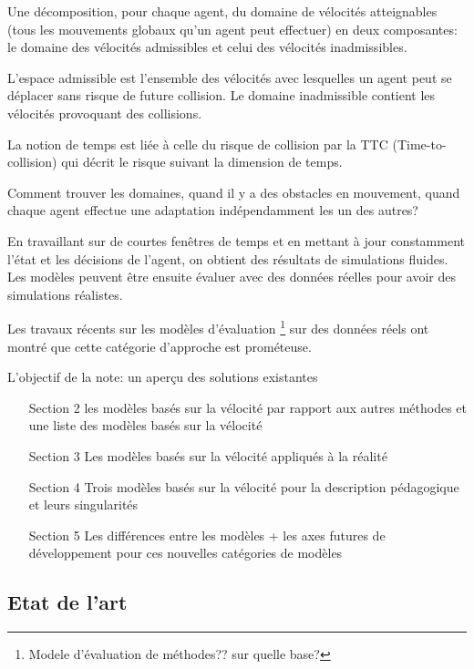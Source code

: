 \documentclass[11pt]{report}
\begin{document}
Une décomposition, pour chaque agent, du domaine de vélocités atteignables (tous les mouvements globaux qu'un agent peut effectuer) en deux composantes: le domaine des vélocités admissibles et celui des vélocités inadmissibles.

L'espace admissible est l'ensemble des vélocités avec lesquelles un agent peut se déplacer sans risque de future collision. Le domaine inadmissible contient les vélocités provoquant des collisions.

La notion de temps est liée à celle du risque de collision par la TTC (Time-to-collision) qui  décrit le risque suivant la dimension de temps.

Comment trouver les domaines, quand il y a des obstacles en mouvement, quand chaque agent effectue une adaptation indépendamment les un des autres?

En travaillant sur de courtes fenêtres de temps et en mettant à jour constamment l'état et les décisions de l'agent, on obtient des résultats de simulations fluides. Les modèles peuvent être ensuite évaluer avec des données réelles pour avoir des simulations réalistes.

Les travaux récents sur les modèles d'évaluation \footnote{Modele d'évaluation de méthodes?? sur quelle base?} sur des données réels ont montré que cette catégorie d'approche est prométeuse.

L'objectif de la note: un aperçu des solutions existantes

\begin{itemize}
	\item[Section 2] les modèles basés sur la vélocité par rapport aux autres méthodes et une  liste des modèles basés sur la vélocité

	\item[Section 3] Les modèles basés sur la vélocité appliqués à la réalité

	\item[Section 4] Trois modèles basés sur la vélocité pour la description pédagogique et leurs singularités

	\item[Section 5] Les différences entre les modèles + les axes futures de développement pour ces nouvelles catégories de modèles
\end{itemize}

\subsection{Etat de l'art}
 
\end{document}
